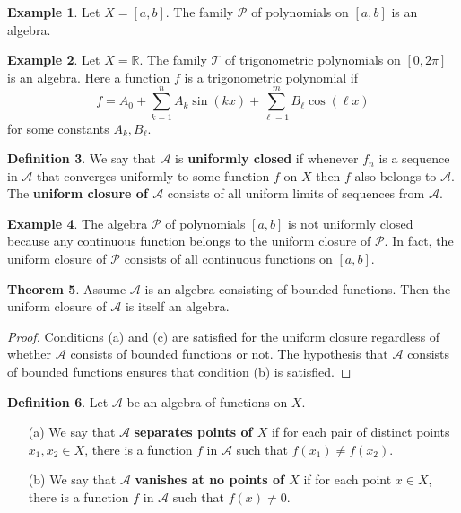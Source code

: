 \documentclass[12pt]{article}
\theoremstyle{definition}
\newtheorem{definition}{Definition}
\newtheorem{example}[definition]{Example}
\theoremstyle{theorem}
\newtheorem{theorem}[definition]{Theorem}
\begin{document}
\begin{example}
Let $X = [a,b]$. The family $\mathcal{P}$ of polynomials on $[a,b]$ is an algebra. 
\end{example}

\begin{example}
Let $X = \mathbb{R}$. The family $\mathcal{T}$ of trigonometric polynomials on $[0,2\pi]$ is an algebra. Here a function $f$ is a trigonometric polynomial if 
\[
f = A_0 + \sum_{k=1}^n A_k \sin(kx) + \sum_{\ell=1}^m B_\ell \cos(\ell x)
\]
for some constants $A_k, B_\ell$. 
\end{example}

\begin{definition}
We say that $\mathcal{A}$ is \textbf{uniformly closed} if whenever $f_n$ is a sequence in $\mathcal{A}$ that converges uniformly to some function $f$ on $X$ then $f$ also belongs to $\mathcal{A}$. The \textbf{uniform closure of $\mathcal{A}$} consists of all uniform limits of sequences from $\mathcal{A}$. 
\end{definition}

\begin{example}
The algebra $\mathcal{P}$ of polynomials $[a,b]$ is not uniformly closed because any continuous function belongs to the uniform closure of $\mathcal{P}$. In fact, the uniform closure of $\mathcal{P}$ consists of all continuous functions on $[a,b]$. 
\end{example}

\begin{theorem}
Assume $\mathcal{A}$ is an algebra consisting of bounded functions. Then the uniform closure of $\mathcal{A}$ is itself an algebra. 
\end{theorem}

\begin{proof}
Conditions (a) and (c) are satisfied for the uniform closure regardless of whether $\mathcal{A}$ consists of bounded functions or not. The hypothesis that $\mathcal{A}$ consists of bounded functions ensures that condition (b) is satisfied. 
\end{proof}


\begin{definition}
Let $\mathcal{A}$ be an algebra of functions on $X$. 
\begin{enumerate}
\item[(a)] We say that $\mathcal{A}$ \textbf{separates points of $X$} if for each pair of distinct points $x_1, x_2 \in X$, there is a function $f$ in $\mathcal{A}$ such that $f(x_1) \ne f(x_2)$. 
\item[(b)] We say that $\mathcal{A}$ \textbf{vanishes at no points of $X$} if for each point $x \in X$, there is a function $f$ in $\mathcal{A}$ such that $f(x) \ne 0$. 
\end{enumerate}
\end{definition}
\end{document}
